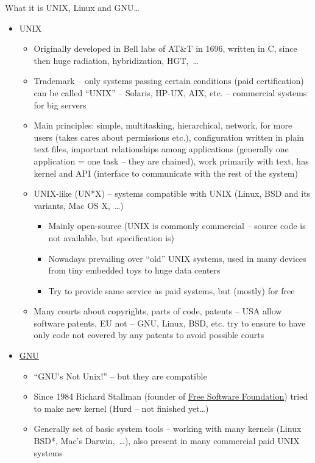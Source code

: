 \documentclass[compress, ucs, xelatex, 11pt, xcolor=svgnames,
  hyperref={
    bookmarks=true,
    unicode=true,
    colorlinks=true,
    pdftitle={Linux, command line and MetaCentrum},
    plainpages=false,
    pdfauthor={Vojtech Zeisek},
    pdfsubject={Course about use of Linux command line, writing shell scripts and using MetaCentrum of CESNET},
    pdfcreator={XeLaTeX},
    pdfkeywords={Linux, GNU, BASH, shell, command line, MetaCentrum},
    linkcolor=Red,
    anchorcolor=Blue,
    citecolor=Purple,
    filecolor=DodgerBlue,
    menucolor=DarkOrchid,
    urlcolor=DeepSkyBlue,
    pdftex},
  url={hyphens, lowtilde} %
  ]{beamer}
\begin{document}
\begin{frame}[allowframebreaks]{What it is UNIX, Linux and GNU\ldots}
\begin{itemize}
  \item UNIX
  \begin{itemize}
    \item Originally developed in Bell labs of AT\&T in 1696, written in C, since then  huge radiation, hybridization, HGT,~\ldots
    \item Trademark -- only systems passing certain conditions (paid certification) can be called ``UNIX'' -- Solaris, HP-UX, AIX, etc. -- commercial systems for big servers
    \item Main principles: simple, multitasking, hierarchical, network, for more users (takes cares about permissions etc.), configuration written in plain text files, important relationships among applications (generally one application = one task -- they are chained), work primarily with text, has kernel and API (interface to communicate with the rest of the system)
    \item UNIX-like (UN*X) -- systems compatible with UNIX (Linux, BSD and its variants, Mac OS X,~\ldots)
    \begin{itemize}
      \item Mainly open-source (UNIX is commonly commercial -- source code is not available, but specification is)
      \item Nowadays prevailing over ``old'' UNIX systems, used in many devices from tiny embedded toys to huge data centers
      \item Try to provide same service as paid systems, but (mostly) for free
    \end{itemize}
    \item Many courts about copyrights, parts of code, patents -- USA allow software patents, EU not -- GNU, Linux, BSD, etc. try to ensure to have only code not covered by any patents to avoid possible courts
  \end{itemize}
  \item \href{https://www.gnu.org/}{GNU}
  \begin{itemize}
    \item ``GNU's Not Unix!'' -- but they are compatible
    \item Since 1984 Richard Stallman (founder of \href{https://www.fsf.org/}{Free Software Foundation}) tried to make new kernel (Hurd -- not finished yet\ldots)
    \item Generally set of basic system tools -- working with many kernels (Linux BSD*, Mac's Darwin,~\ldots), also present in many commercial paid UNIX systems

\end{itemize}
\end{itemize}
\end{frame}
\end{document}
